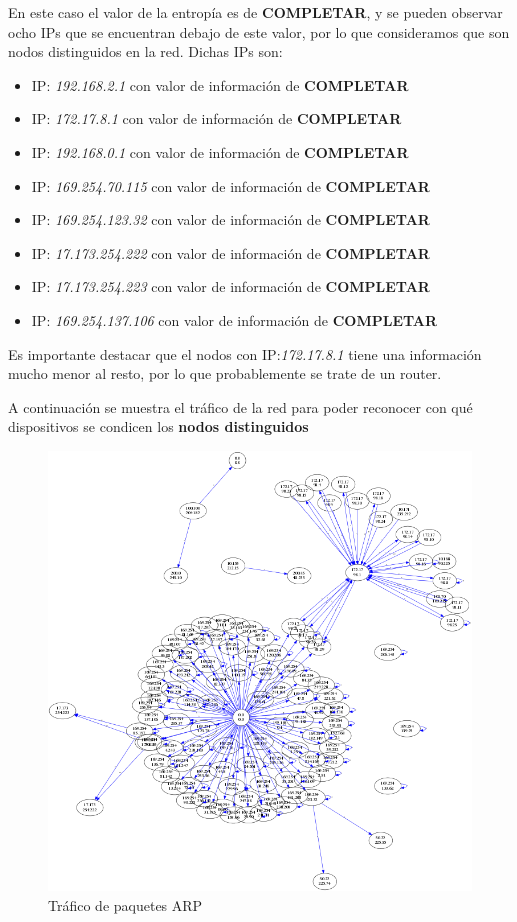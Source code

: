 En este caso el valor de la entropía es de \textbf{COMPLETAR}, y se pueden observar ocho IPs que se encuentran debajo de este valor, por lo que consideramos que son nodos distinguidos en la red. Dichas IPs son:
\begin{itemize}
\item IP: \textit{192.168.2.1} con valor de información de \textbf{COMPLETAR}
\item IP: \textit{172.17.8.1} con valor de información de \textbf{COMPLETAR}
\item IP: \textit{192.168.0.1} con valor de información de \textbf{COMPLETAR}
\item IP: \textit{169.254.70.115} con valor de información de \textbf{COMPLETAR}
\item IP: \textit{169.254.123.32} con valor de información de \textbf{COMPLETAR}
\item IP: \textit{17.173.254.222} con valor de información de \textbf{COMPLETAR}
\item IP: \textit{17.173.254.223} con valor de información de \textbf{COMPLETAR}
\item IP: \textit{169.254.137.106} con valor de información de \textbf{COMPLETAR}
\end{itemize}

Es importante destacar que el nodos con IP:\textit{172.17.8.1} tiene una información mucho menor al resto, por lo que probablemente se trate de un router.

A continuación se muestra el tráfico de la red para poder reconocer con qué dispositivos se condicen los \textbf{nodos distinguidos}

\begin{figure}[H]
       \centering
       \includegraphics[width=1\textwidth]{../resultados/McDonalds/network.png}
       \caption{Tráfico de paquetes ARP}
       \label{red-hogarena-arp-traffic}
\end{figure}


